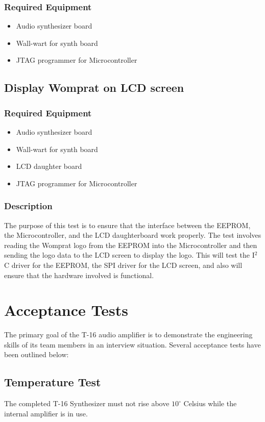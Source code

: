 \documentclass{article}
\begin{document}
\subsubsection{Required Equipment}
\begin{itemize}
\item Audio synthesizer board
\item Wall-wart for synth board
\item JTAG programmer for Microcontroller
\end{itemize}

\subsection{Display Womprat on LCD screen}
\subsubsection{Required Equipment}
\begin{itemize}
\item Audio synthesizer board
\item Wall-wart for synth board
\item LCD daughter board
\item JTAG programmer for Microcontroller
\end{itemize}
\subsubsection{Description}
The purpose of this test is to ensure that the interface between the EEPROM, the Microcontroller, and the LCD daughterboard work properly. The test involves reading the Womprat logo from the EEPROM into the Microcontroller and then sending the logo data to the LCD screen to display the logo. This will test the I$^2$C driver for the EEPROM, the SPI driver for the LCD screen, and also will ensure that the hardware involved is functional.


\section{Acceptance Tests}
The primary goal of the T-16 audio amplifier is to demonstrate the
engineering skills of its team members in an interview
situation. Several acceptance tests have been outlined below:

\subsection{Temperature Test}
The completed T-16 Synthesizer must not rise above $10^\circ$ Celsius
while the internal amplifier is in use.
\end{document}
